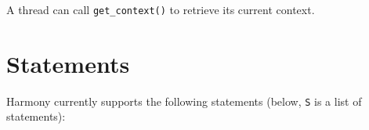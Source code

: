 \documentclass{report}
\begin{document}

A thread can call \texttt{get\_context()} to retrieve its current
context.

\section{Statements}

Harmony currently supports the following statements (below, \texttt{S} is a list of statements):
\end{document}
